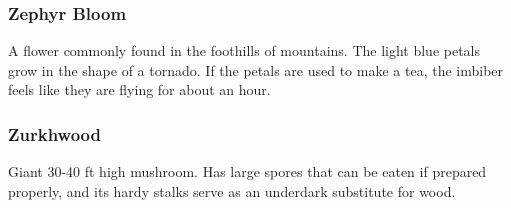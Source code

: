 \subsubsection{Zephyr Bloom}
\label{zephyr_bloom}

A flower commonly found in the foothills of mountains. The light blue petals grow in the shape of a tornado. If the petals are used to make a tea, the imbiber feels like they are flying for about an hour.

\subsubsection{Zurkhwood}

Giant 30-40 ft high mushroom. Has large spores that can be eaten if prepared properly, and its hardy stalks serve as an underdark substitute for wood.
